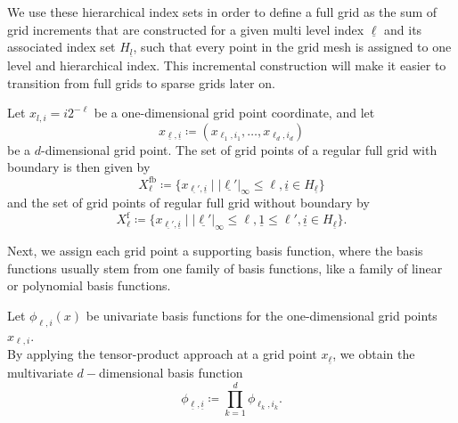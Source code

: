 \documentclass[
  a4paper,  %
  twoside,  %
  bibliography=totoc,
  headsepline,
  cleardoublepage=empty,
  parskip=half,
  draft=false
]{scrbook}
\begin{document}
We use these hierarchical index sets in order to define a full grid as the sum of grid increments that are constructed for a given multi level index $\underline{\ell}$ and its associated index set $H_{\underline{l}}$, such that every point in the grid mesh is assigned to one level and hierarchical index.
This incremental construction will make it easier to transition from full grids to sparse grids later on.
\begin{definition}
Let $x_{l,i}=i2^{-\ell}$ be a one-dimensional grid point coordinate, and let
\begin{equation}
x_{\underline{\ell},\underline{i}} \coloneqq (x_{\ell_1,i_1}, \dots, x_{\ell_d,i_d})
\end{equation}
be a $d$-dimensional grid point. The set of grid points of a regular full grid with boundary is then given by
\begin{equation}
X^{\text{fb}}_{\ell} \coloneqq \{x_{\underline{\ell'},\underline{i}} \mid |\underline{\ell'}|_{\infty} \leq \ell, \underline{i} \in H_{\underline{\ell}}\}
\end{equation}
and the set of grid points of regular full grid without boundary by
\begin{equation}
X^{\text{f}}_{\ell} \coloneqq \{x_{\underline{\ell'},\underline{i}} \mid |\underline{\ell'}|_{\infty} \leq \ell, \underline{1} \leq \ell',  \underline{i} \in H_{\underline{\ell}}\}.
\end{equation}
\end{definition}

Next, we assign each grid point a supporting basis function, where the basis functions usually stem from one family of basis functions, like a family of linear or polynomial basis functions.
\begin{definition}
Let $\phi_{\ell,i}(x)$ be univariate basis functions for the one-dimensional grid points $x_{\ell,i}$.\\
By applying the tensor-product approach at a grid point $x_{\underline{\ell}}$, we obtain the multivariate $d-$dimensional basis function
\begin{equation}
\phi_{\underline{\ell},\underline{i}} \coloneqq \prod_{k=1}^{d} \phi_{\ell_k,i_k}.
\label{eq:basis_functions}
\end{equation}
\end{definition}
\end{document}
